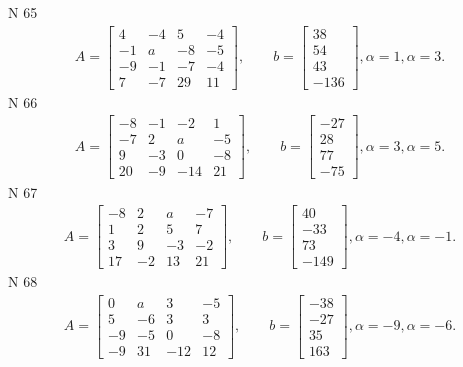 \documentclass[11pt]{report}
\begin{document}
N 65
\begin{align*}
 A = \left[\begin{matrix}4 & -4 & 5 & -4\\-1 & a & -8 & -5\\-9 & -1 & -7 & -4\\7 & -7 & 29 & 11\end{matrix}\right],
    \qquad b = \left[\begin{matrix}38\\54\\43\\-136\end{matrix}\right], \alpha = 1, \alpha = 3. 
 \end{align*}
N 66
\begin{align*}
 A = \left[\begin{matrix}-8 & -1 & -2 & 1\\-7 & 2 & a & -5\\9 & -3 & 0 & -8\\20 & -9 & -14 & 21\end{matrix}\right],
    \qquad b = \left[\begin{matrix}-27\\28\\77\\-75\end{matrix}\right], \alpha = 3, \alpha = 5. 
 \end{align*}
N 67
\begin{align*}
 A = \left[\begin{matrix}-8 & 2 & a & -7\\1 & 2 & 5 & 7\\3 & 9 & -3 & -2\\17 & -2 & 13 & 21\end{matrix}\right],
    \qquad b = \left[\begin{matrix}40\\-33\\73\\-149\end{matrix}\right], \alpha = -4, \alpha = -1. 
 \end{align*}
N 68
\begin{align*}
 A = \left[\begin{matrix}0 & a & 3 & -5\\5 & -6 & 3 & 3\\-9 & -5 & 0 & -8\\-9 & 31 & -12 & 12\end{matrix}\right],
    \qquad b = \left[\begin{matrix}-38\\-27\\35\\163\end{matrix}\right], \alpha = -9, \alpha = -6. 
 \end{align*}
\end{document}
